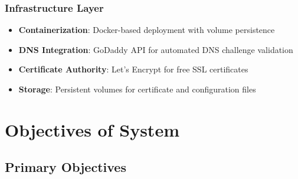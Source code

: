 \subsubsection{Infrastructure Layer}
\begin{itemize}
    \item \textbf{Containerization}: Docker-based deployment with volume persistence
    \item \textbf{DNS Integration}: GoDaddy API for automated DNS challenge validation
    \item \textbf{Certificate Authority}: Let's Encrypt for free SSL certificates
    \item \textbf{Storage}: Persistent volumes for certificate and configuration files
\end{itemize}

\section{Objectives of System}

\subsection{Primary Objectives}

